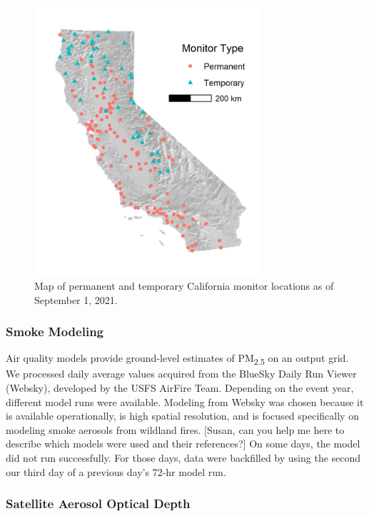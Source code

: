 \documentclass[gmd, manuscript]{copernicus}
\begin{document}
\begin{figure}
\includegraphics[width=8.3cm]{./Figures/MonitorsGMD} \caption{Map of permanent and temporary California monitor locations as of September 1, 2021.}\label{fig:monitors}
\end{figure}

\subsubsection{Smoke Modeling}

Air quality models provide ground-level estimates of
PM\textsubscript{2.5} on an output grid. We processed daily average
values acquired from the BlueSky Daily Run Viewer (Websky), developed by
the USFS AirFire Team. Depending on the event year, different model runs
were available. Modeling from Websky was chosen because it is available
operationally, is high spatial resolution, and is focused specifically
on modeling smoke aerosols from wildland fires. {[}Susan, can you help
me here to describe which models were used and their references?{]} On
some days, the model did not run successfully. For those days, data were
backfilled by using the second our third day of a previous day's 72-hr
model run.

\subsubsection{Satellite Aerosol Optical Depth}
\end{document}
